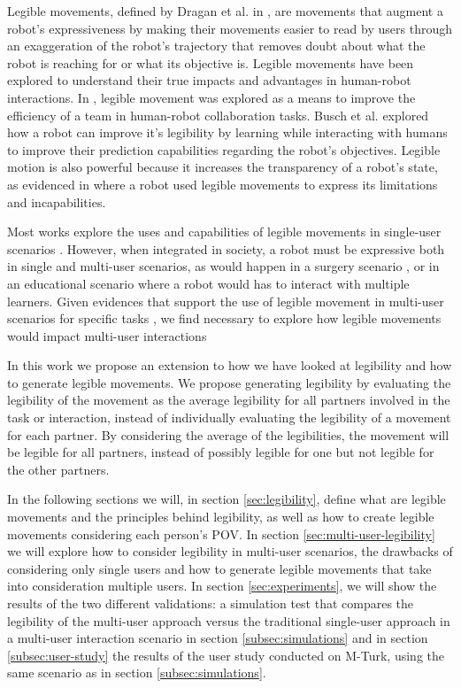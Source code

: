 \documentclass[letterpaper, 10 pt, conference]{ieeeconf}
\begin{document}
Legible movements, defined by Dragan et al. in \cite{dragan2013hri}, are movements that augment a robot's expressiveness by making their movements easier to read by users through an exaggeration of the robot's trajectory that removes doubt about what the robot is reaching for or what its objective is. Legible movements have been explored to understand their true impacts and advantages in human-robot interactions. In \cite{dragan2015hri, faria2017iros}, legible movement was explored as a means to improve the efficiency of a team in human-robot collaboration tasks. Busch et al. \cite{busch2017ijsr} explored how a robot can improve it's legibility by learning while interacting with humans to improve their prediction capabilities regarding the robot's objectives. Legible motion is also powerful because it increases the transparency of a robot's state, as evidenced in \cite{kwon2018hri} where a robot used legible movements to express its limitations and incapabilities.

Most works explore the uses and capabilities of legible movements in single-user scenarios \cite{dragan2015hri, busch2017ijsr}. However, when integrated in society, a robot must be expressive both in single and multi-user scenarios, as would happen in a surgery scenario \cite{kaplan2016icra}, or in an educational scenario where a robot would has to interact with multiple learners. Given evidences that support the use of legible movement in multi-user scenarios for specific tasks \cite{faria2017iros}, we find necessary to explore how legible movements would impact multi-user interactions

In this work we propose an extension to how we have looked at legibility and how to generate legible movements. We propose generating legibility by evaluating the legibility of the movement as the average legibility for all partners involved in the task or interaction, instead of individually evaluating the legibility of a movement for each partner. By considering the average of the legibilities, the movement will be legible for all partners, instead of possibly legible for one but not legible for the other partners.

In the following sections we will, in section \ref{sec:legibility}, define what are legible movements and the principles behind legibility, as well as how to create legible movements considering each person's \ac{POV}. In section \ref{sec:multi-user-legibility} we will explore how to consider legibility in multi-user scenarios, the drawbacks of considering only single users and how to generate legible movements that take into consideration multiple users. In section \ref{sec:experiments}, we will show the results of the two different validations: a simulation test that compares the legibility of the multi-user approach versus the traditional single-user approach in a multi-user interaction scenario in section \ref{subsec:simulations} and in section \ref{subsec:user-study} the results of the user study conducted on \ac{M-Turk}, using the same scenario as in section \ref{subsec:simulations}.
\end{document}
